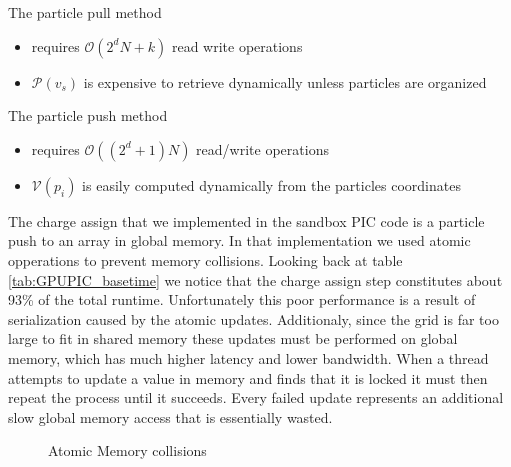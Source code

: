 The particle pull method
\begin{itemize}
\item requires $\mathcal{O}(2^dN + k)$ read write operations
\item $\mathcal{P}(v_s)$ is expensive to retrieve dynamically unless particles are organized
\end{itemize}

The particle push method
\begin{itemize}
\item requires $\mathcal{O}((2^d+1)N)$ read/write operations
\item $\mathcal{V}(p_i)$ is easily computed dynamically from the particles coordinates
\end{itemize}

The charge assign that we implemented in the sandbox PIC code is a particle push to an array in global memory. In that implementation we used atomic opperations to prevent memory collisions. Looking back at table \ref{tab:GPUPIC_basetime} we notice that the charge assign step constitutes about 93\% of the total runtime.  Unfortunately this poor performance is a result of serialization caused by the atomic updates. Additionaly, since the grid is far too large to fit in shared memory these updates must be performed on global memory, which has much higher latency and lower bandwidth. When a thread attempts to update a value in memory and finds that it is locked it must then repeat the process until it succeeds. Every failed update represents an additional slow global memory access that is essentially wasted. 

\begin{figure}
\begin{center}

\end{center}
\caption{Atomic Memory collisions}
\label{fig:pic_flowchart_parallel}
\end{figure}

